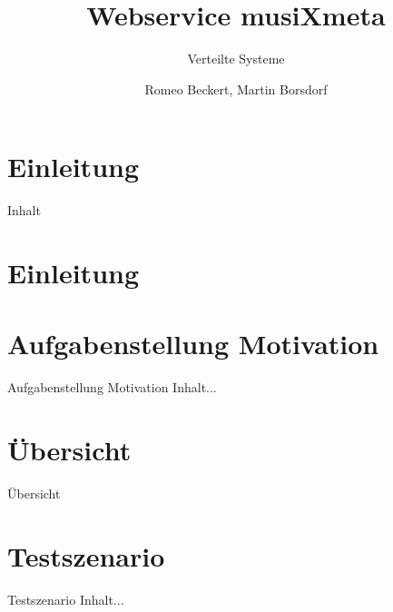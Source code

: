 \documentclass[]{beamer} %
\author{Romeo Beckert, Martin Borsdorf}
\title{Webservice musiXmeta}
\subtitle{Verteilte Systeme}
\institute[MNI]{IF13wI--B}
\begin{document}
\nextframenocontents
\maketitle

\section*{Einleitung}
	\begin{frame}{Inhalt}
	\transdissolve<1>
	\tableofcontents
	\end{frame}

\section{Einleitung}
	\begin{frame}
	
	\end{frame}
	
		
\section{Aufgabenstellung Motivation}

	\begin{frame}{Aufgabenstellung Motivation}
	Inhalt...
	\end{frame}


\section{Übersicht}

	\begin{frame}{Übersicht}
	
	\end{frame}


\section{Testszenario}

	\begin{frame}{Testszenario}
	Inhalt...
	\end{frame}
\end{document}
